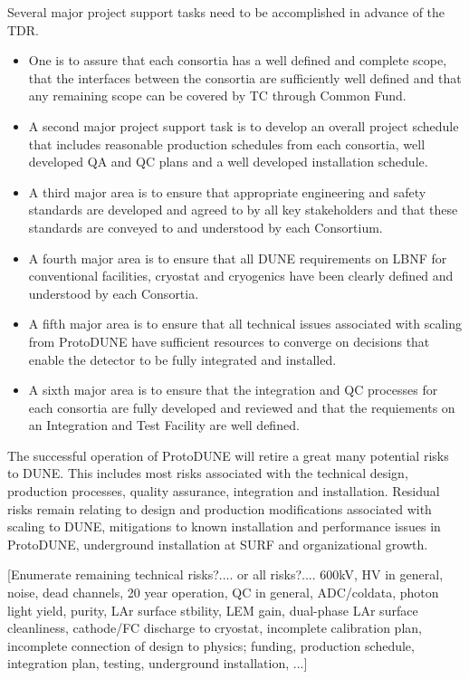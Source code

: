 Several major project support tasks need to be accomplished in advance
of the TDR.
\begin{itemize}
  \item One is to assure that each consortia has a well defined
and complete scope, that the interfaces between the consortia are
sufficiently well defined and that any remaining scope can be covered
by TC through Common Fund.
  \item A second major project support task is to
develop an overall project schedule that includes reasonable
production schedules from each consortia, well developed QA and QC
plans and a well developed installation schedule.
  \item A third major area
is to ensure that appropriate engineering and safety standards are
developed and agreed to by all key stakeholders and that these
standards are conveyed to and understood by each Consortium.
  \item A fourth
major area is to ensure that all DUNE requirements on LBNF for
conventional facilities, cryostat and cryogenics have been clearly
defined and understood by each Consortia.
  \item A fifth major area is to
ensure that all technical issues associated with scaling from
ProtoDUNE have sufficient resources to converge on decisions that
enable the detector to be fully integrated and installed.
  \item A sixth
major area is to ensure that the integration and QC processes for each
consortia are fully developed and reviewed and that the requiements on
an Integration and Test Facility are well defined.
\end{itemize}

The successful operation of ProtoDUNE will retire a great many
potential risks to DUNE. This includes most risks associated with the
technical design, production processes, quality assurance, integration
and installation. Residual risks remain relating to design and
production modifications associated with scaling to DUNE, mitigations
to known installation and performance issues in ProtoDUNE, underground
installation at SURF and organizational growth.

[Enumerate remaining technical risks?.... or all risks?.... 600kV, HV
  in general, noise, dead channels, 20 year operation, QC in general,
  ADC/coldata, photon light yield, purity, LAr surface stbility, LEM
  gain, dual-phase LAr surface cleanliness, cathode/FC discharge to
  cryostat, incomplete calibration plan, incomplete connection of
  design to physics; funding, production schedule, integration plan,
  testing, underground installation, ...]

